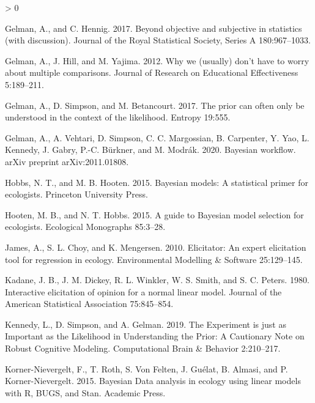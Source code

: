 \documentclass[
  12pt,
]{article}
\newlength{\cslhangindent}
\newenvironment{CSLReferences}[2] %
 {%
  \setlength{\parindent}{0pt}
  \ifodd #1 \everypar{\setlength{\hangindent}{\cslhangindent}}\ignorespaces\fi
  \ifnum #2 > 0
  \setlength{\parskip}{#2\baselineskip}
  \fi
 }%
 {}
\begin{document}
\begin{CSLReferences}{1}{0}
\leavevmode\hypertarget{ref-gelman_beyond_2017}{}%
Gelman, A., and C. Hennig. 2017. Beyond objective and subjective in
statistics (with discussion). Journal of the Royal Statistical Society,
Series A 180:967--1033.

\leavevmode\hypertarget{ref-gelman_why_2012}{}%
Gelman, A., J. Hill, and M. Yajima. 2012. Why we (usually) don't have to
worry about multiple comparisons. Journal of Research on Educational
Effectiveness 5:189--211.

\leavevmode\hypertarget{ref-gelman_prior_2017}{}%
Gelman, A., D. Simpson, and M. Betancourt. 2017. The prior can often
only be understood in the context of the likelihood. Entropy 19:555.

\leavevmode\hypertarget{ref-gelman_bayesian_2020}{}%
Gelman, A., A. Vehtari, D. Simpson, C. C. Margossian, B. Carpenter, Y.
Yao, L. Kennedy, J. Gabry, P.-C. Bürkner, and M. Modrák. 2020. Bayesian
workflow. arXiv preprint arXiv:2011.01808.

\leavevmode\hypertarget{ref-hobbs_bayesian_2015}{}%
Hobbs, N. T., and M. B. Hooten. 2015. Bayesian models: A statistical
primer for ecologists. Princeton University Press.

\leavevmode\hypertarget{ref-hooten_guide_2015}{}%
Hooten, M. B., and N. T. Hobbs. 2015. A guide to {Bayesian} model
selection for ecologists. Ecological Monographs 85:3--28.

\leavevmode\hypertarget{ref-james_elicitator_2010}{}%
James, A., S. L. Choy, and K. Mengersen. 2010. Elicitator: An expert
elicitation tool for regression in ecology. Environmental Modelling \&
Software 25:129--145.

\leavevmode\hypertarget{ref-kadane_interactive_1980}{}%
Kadane, J. B., J. M. Dickey, R. L. Winkler, W. S. Smith, and S. C.
Peters. 1980. Interactive elicitation of opinion for a normal linear
model. Journal of the American Statistical Association 75:845--854.

\leavevmode\hypertarget{ref-kennedy_experiment_2019}{}%
Kennedy, L., D. Simpson, and A. Gelman. 2019. The {Experiment} is just
as {Important} as the {Likelihood} in {Understanding} the {Prior}: A
{Cautionary} {Note} on {Robust} {Cognitive} {Modeling}. Computational
Brain \& Behavior 2:210--217.

\leavevmode\hypertarget{ref-korner-nievergelt_bayesian_2015}{}%
Korner-Nievergelt, F., T. Roth, S. Von Felten, J. Guélat, B. Almasi, and
P. Korner-Nievergelt. 2015. Bayesian {Data} analysis in ecology using
linear models with {R}, {BUGS}, and {Stan}. Academic Press.


\end{CSLReferences}
\end{document}

